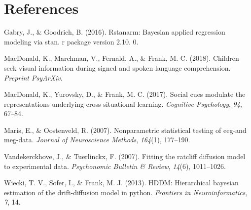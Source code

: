 \documentclass[man,floatsintext]{apa6}
\begin{document}
\newpage

\section{References}\label{references}

\begingroup
\setlength{\parindent}{-0.5in} \setlength{\leftskip}{0.5in}

\hypertarget{refs}{}
\hypertarget{ref-gabry2016rstanarm}{}
Gabry, J., \& Goodrich, B. (2016). Rstanarm: Bayesian applied regression
modeling via stan. r package version 2.10. 0.

\hypertarget{ref-macdonald2018speed}{}
MacDonald, K., Marchman, V., Fernald, A., \& Frank, M. C. (2018).
Children seek visual information during signed and spoken language
comprehension. \emph{Preprint PsyArXiv}.

\hypertarget{ref-macdonald2017social}{}
MacDonald, K., Yurovsky, D., \& Frank, M. C. (2017). Social cues
modulate the representations underlying cross-situational learning.
\emph{Cognitive Psychology}, \emph{94}, 67--84.

\hypertarget{ref-maris2007nonparametric}{}
Maris, E., \& Oostenveld, R. (2007). Nonparametric statistical testing
of eeg-and meg-data. \emph{Journal of Neuroscience Methods},
\emph{164}(1), 177--190.

\hypertarget{ref-vandekerckhove2007fitting}{}
Vandekerckhove, J., \& Tuerlinckx, F. (2007). Fitting the ratcliff
diffusion model to experimental data. \emph{Psychonomic Bulletin \&
Review}, \emph{14}(6), 1011--1026.

\hypertarget{ref-wiecki2013hddm}{}
Wiecki, T. V., Sofer, I., \& Frank, M. J. (2013). HDDM: Hierarchical
bayesian estimation of the drift-diffusion model in python.
\emph{Frontiers in Neuroinformatics}, \emph{7}, 14.

\endgroup
\end{document}
